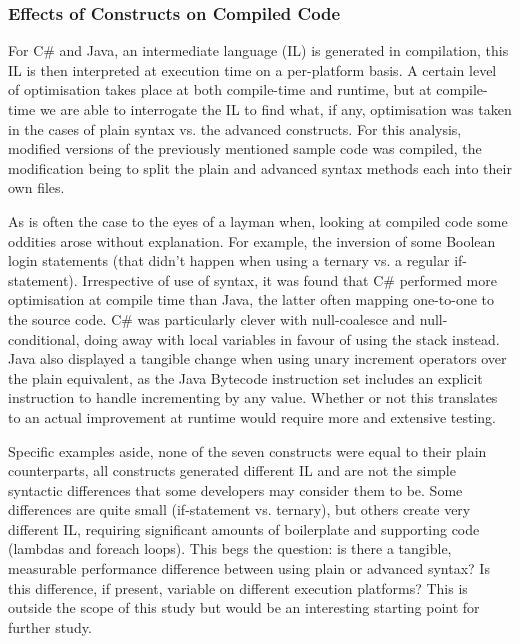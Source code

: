 \documentclass{article}
\begin{document}
        \subsubsection{Effects of Constructs on Compiled Code}
            For C\# and Java, an intermediate language (IL) is generated in compilation, this IL is then interpreted at execution time on a per-platform basis. A certain level of optimisation takes place at both compile-time and runtime, but at compile-time we are able to interrogate the IL to find what, if any, optimisation was taken in the cases of plain syntax vs. the advanced constructs. For this analysis, modified versions of the previously mentioned sample code was compiled, the modification being to split the plain and advanced syntax methods each into their own files.

            As is often the case to the eyes of a layman when, looking at compiled code some oddities arose without explanation. For example, the inversion of some Boolean login statements (that didn't happen when using a ternary vs. a regular if-statement). Irrespective of use of syntax, it was found that C\# performed more optimisation at compile time than Java, the latter often mapping one-to-one to the source code. C\# was particularly clever with null-coalesce and null-conditional, doing away with local variables in favour of using the stack instead. Java also displayed a tangible change when using unary increment operators over the plain equivalent, as the Java Bytecode instruction set includes an explicit instruction to handle incrementing by any value. Whether or not this translates to an actual improvement at runtime would require more and extensive testing.

            Specific examples aside, none of the seven constructs were equal to their plain counterparts, all constructs generated different IL and are not the simple syntactic differences that some developers may consider them to be. Some differences are quite small (if-statement vs. ternary), but others create very different IL, requiring significant amounts of boilerplate and supporting code (lambdas and foreach loops). This begs the question: is there a tangible, measurable performance difference between using plain or advanced syntax? Is this difference, if present, variable on different execution platforms? This is outside the scope of this study but would be an interesting starting point for further study.
\end{document}
